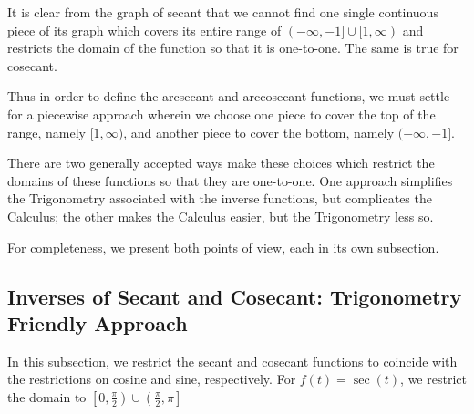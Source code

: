\bigskip

It is clear from the graph of secant that we cannot find one single continuous piece of its graph which covers its entire range of $(-\infty, -1] \cup [1, \infty)$ and restricts the domain of the function so that it is one-to-one.  The same is true for cosecant.  

\smallskip

Thus in order to define the arcsecant and arccosecant functions, we must settle for a piecewise approach wherein we choose one piece to cover the top of the range, namely  $[1, \infty)$, and another piece to cover the bottom, namely $(-\infty, -1]$.  

\smallskip

There are two generally accepted ways make these choices which restrict the domains of these functions so that they are one-to-one.  One approach simplifies the Trigonometry associated with the inverse functions, but complicates the Calculus;  the other makes the Calculus easier, but the Trigonometry less so. 

\smallskip

For completeness,  we present both points of view, each in its own subsection.

\newpage

\subsection{Inverses of Secant and Cosecant: Trigonometry Friendly Approach}
\label{arcsecanttrigfriendly}

In this subsection, we restrict the secant and cosecant functions to coincide with the restrictions on cosine and sine, respectively.  For $f(t) = \sec(t)$, we restrict the domain to $\left[0, \frac{\pi}{2}\right) \cup \left( \frac{\pi}{2}, \pi\right]$ 



